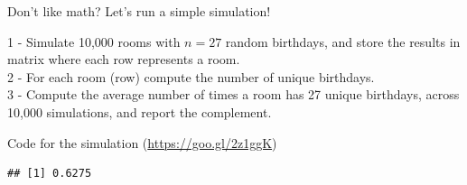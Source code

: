 \begin{frame}{Don't like math? Let's run a simple simulation!}

1 - Simulate 10,000 rooms with \(n = 27\) random birthdays, and store
the results in matrix where each row represents a room.\\
2 - For each room (row) compute the number of unique birthdays.\\
3 - Compute the average number of times a room has 27 unique birthdays,
across 10,000 simulations, and report the complement.

\end{frame}

\begin{frame}[fragile]{Code for the simulation
(\url{https://goo.gl/2z1ggK})}

\begin{Shaded}
\begin{Highlighting}[]
\StringTok{ }
\StringTok{ }\NormalTok{(}\NormalTok{(}\OperatorTok{*}\StringTok{ }
                                 \NormalTok{, }\NormalTok{)), }
\StringTok{ }
\StringTok{ }\NormalTok{(}
\OperatorTok{==}\StringTok{ }
\StringTok{ } \OperatorTok{-}\StringTok{ }
\NormalTok{\}}
\StringTok{ }
\StringTok{ }
\end{Highlighting}
\end{Shaded}

\begin{verbatim}
## [1] 0.6275
\end{verbatim}

\end{frame}

